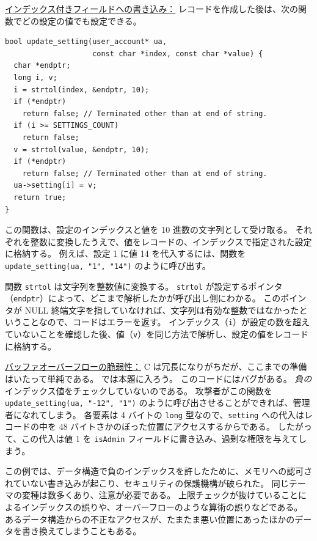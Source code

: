 \documentclass[uplatex]{jsarticle}
\def\label#1{}%
\begin{document}
\underline{インデックス付きフィールドへの書き込み：}
レコードを作成した後は、次の関数でどの設定の値でも設定できる。

\begin{verbatim}
bool update_setting(user_account* ua,
                    const char *index, const char *value) {
  char *endptr;
  long i, v;
  i = strtol(index, &endptr, 10);
  if (*endptr)
    return false; // Terminated other than at end of string.
  if (i >= SETTINGS_COUNT)
    return false;
  v = strtol(value, &endptr, 10);
  if (*endptr)
    return false; // Terminated other than at end of string.
  ua->setting[i] = v;
  return true;
}
\end{verbatim}

この関数は、設定のインデックスと値を 10 進数の文字列として受け取る。
それぞれを整数に変換したうえで、値をレコードの、インデックスで指定された設定に格納する。
例えば、設定 1 に値 14 を代入するには、関数を \verb|update_setting(ua, "1", "14")| のように呼び出す。

関数 \texttt{strtol} は文字列を整数値に変換する。
\texttt{strtol} が設定するポインタ（\texttt{endptr}）によって、どこまで解析したかが呼び出し側にわかる。
このポインタが NULL 終端文字を指していなければ、文字列は有効な整数ではなかったということなので、コードはエラーを返す。
インデックス（\texttt{i}）が設定の数を超えていないことを確認した後、値（\texttt{v}）を同じ方法で解析し、設定の値をレコードに格納する。

\underline{バッファオーバーフローの脆弱性：}
C は冗長になりがちだが、ここまでの準備はいたって単純である。
では本題に入ろう。
このコードにはバグがある。
\emph{負の}インデックス値をチェックしていないのである。
攻撃者がこの関数を \verb|update_setting(ua, "-12", "1")| のように呼び出させることができれば、管理者になれてしまう。
各要素は 4 バイトの \texttt{long} 型なので、\texttt{setting} への代入はレコードの中を 48 バイトさかのぼった位置にアクセスするからである。
したがって、この代入は値 1 を \texttt{isAdmin} フィールドに書き込み、過剰な権限を与えてしまう。

\begin{exa}[負のインデックスによる権限昇格]\label{exa:ch9-negative-index}
この例では、データ構造で負のインデックスを許したために、メモリへの認可されていない書き込みが起こり、セキュリティの保護機構が破られた。
同じテーマの変種は数多くあり、注意が必要である。
上限チェックが抜けていることによるインデックスの誤りや、オーバーフローのような算術の誤りなどである。
あるデータ構造からの不正なアクセスが、たまたま悪い位置にあったほかのデータを書き換えてしまうこともある。
\end{exa}
\end{document}
